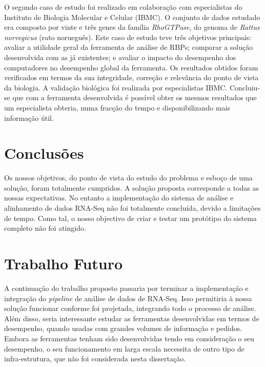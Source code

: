 \documentclass[9pt,a4paper]{extarticle}
\begin{document}
\begin{multicols}{2}
O segundo caso de estudo foi realizado em colaboração com especialistas do
Instituto de Biologia Molecular e Celular (IBMC). O conjunto de dados estudado
era composto por vinte e três genes da família \emph{RhoGTPase}, do genoma de
\emph{Rattus norvegicus} (rato norueguês). Este caso de estudo teve três
objetivos principais: avaliar a utilidade geral da ferramenta de análise de
RBPs; comparar a solução desenvolvida com as já existentes; e avaliar o impacto
do desempenho dos computadores no desempenho global da ferramenta. Os resultados
obtidos foram verificados em termos da sua integridade,  correção e relevância
do ponto de vista da biologia. A validação biológica foi realizada por
especialistas IBMC. Concluiu-se que com a ferramenta desenvolvida é possível
obter os mesmos resultados que um especialista obteria, numa fracção do tempo e
disponibilizando mais informação útil.

\section{Conclusões}

Os nossos objetivos, do ponto de vista do estudo do problema e esboço de uma
solução, foram totalmente cumpridos. A solução proposta corresponde a todas as
nossas expectativas. No entanto a implementação do sistema de análise e
alinhamento de dados RNA-Seq não foi totalmente concluída, devido a limitações
de tempo. Como tal, o nosso objectivo de criar e testar um protótipo do sistema
completo não foi atingido.

\section{Trabalho Futuro}

A continuação do trabalho proposto passaria por terminar a implementação e
integração do \emph{pipeline} de análise de dados de RNA-Seq. Isso permitiria à
nossa solução funcionar conforme foi projetada, integrando todo o processo de
análise. Além disso, seria interessante estudar as ferramentas desenvolvidas em
termos de desempenho, quando usadas com grandes volumes de informação e pedidos.
Embora as ferramentas tenham sido desenvolvidas tendo em consideração o seu
desempenho, o seu funcionamento em larga escala necessita de outro tipo de
infra-estrutura, que não foi considerada nesta dissertação.



\end{multicols}
\end{document}
